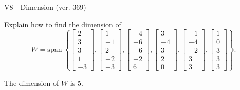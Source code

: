 \begin{exercise}
  \begin{exerciseTitle}V8 - Dimension (ver. 369)\end{exerciseTitle}
  \begin{exerciseStatement}
    Explain how to find the dimension of 
\[W=\mathrm{span}\ \left\{\left[\begin{array}{r}
2 \\
3 \\
3 \\
1 \\
-3
\end{array}\right] , \left[\begin{array}{r}
1 \\
-1 \\
2 \\
-2 \\
-3
\end{array}\right] , \left[\begin{array}{r}
-4 \\
-6 \\
-6 \\
-2 \\
6
\end{array}\right] , \left[\begin{array}{r}
3 \\
-4 \\
3 \\
2 \\
0
\end{array}\right] , \left[\begin{array}{r}
-1 \\
-4 \\
-2 \\
3 \\
3
\end{array}\right] , \left[\begin{array}{r}
1 \\
0 \\
3 \\
3 \\
3
\end{array}\right]\right\}.\]



  \end{exerciseStatement}
  \begin{exerciseAnswer}
   The dimension of \(W\) is  \(5\).
  


  \end{exerciseAnswer}
\end{exercise}